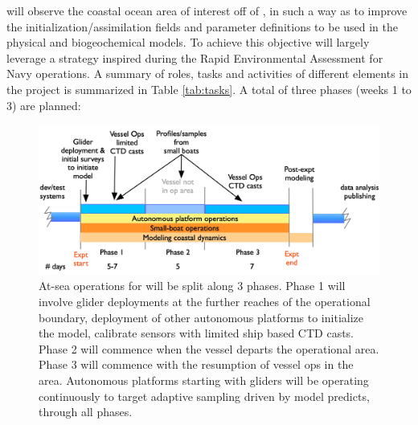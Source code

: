 \proj will observe the coastal ocean area of interest off of \naze, in
such a way as to improve the initialization/assimilation fields and
parameter definitions to be used in the physical and biogeochemical
models. To achieve this objective \proj will largely leverage a
strategy inspired during the Rapid Environmental Assessment for Navy
operations. A summary of roles, tasks and activities of different
elements in the project is summarized in Table \ref{tab:tasks}. A
total of three phases (weeks 1 to 3) are planned:

\begin{figure}[!t]
  \vspace{-0.5cm}
  \centering
  \includegraphics[scale=0.25]{fig/timelines.jpg}
  \caption{At-sea operations for \proj will be split along 3 phases.
    Phase 1 will involve glider deployments at the further reaches of
    the operational boundary, deployment of other autonomous platforms
    to initialize the model, calibrate sensors with limited ship based
    CTD casts. Phase 2 will commence when the vessel departs the \naz
    operational area. Phase 3 will commence with the resumption of
    vessel ops in the \naz area. Autonomous platforms starting with
    gliders will be operating continuously to target adaptive sampling
    driven by model predicts, through all phases.}
  \vspace{-0.3cm}
 \label{fig:expt-phases}
\end{figure}

 
